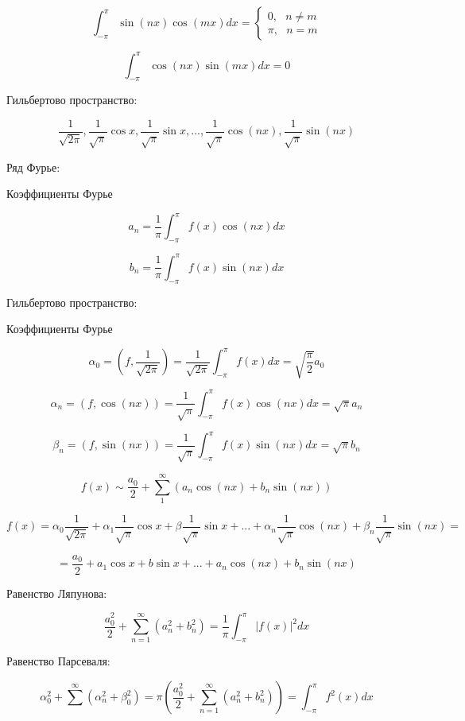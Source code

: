 \documentclass[12pt, a4paper]{report}
\begin{document}
\[ \int_{- \pi }^{\pi } \sin (nx )\cos (mx )dx = \begin{cases}
0 , \text{ } n \neq m \\ 
\pi , \text{ } n = m 
\end{cases}  \] 

\[ \int_{- \pi }^{\pi } \cos (nx ) \sin (mx ) dx = 0  \] 

Гильбертово пространство: 

\[ \frac{1}{\sqrt{2 \pi }} , \frac{1}{\sqrt{\pi } } \cos x , \frac{1}{\sqrt{\pi } } \sin x ,..., \frac{1}{\sqrt{\pi } } \cos(nx) , \frac{1}{\sqrt{\pi } } \sin (nx)      \] 

Ряд Фурье: 

Коэффициенты Фурье

\[ a_n = \frac{1}{\pi} \int_{- \pi }^{\pi}  f(x ) \cos (nx )dx \] 

\[ b_n = \frac{1}{\pi }\int_{- \pi }^{\pi } f(x ) \sin (nx ) dx    \] 

Гильбертово пространство: 

Коэффициенты Фурье

\[ \alpha_0 = \left(  f , \frac{1}{\sqrt{2 \pi } }  \right) = \frac{1}{\sqrt{2 \pi } } \int_{ - \pi }^{\pi } f (x ) dx = \sqrt{\frac{ \pi }{2 } } a_0    \] 

\[ \alpha_n = \left( f ,\cos (nx ) \right) = \frac{1}{\sqrt{\pi } } \int_{- \pi }^{\pi } f(x ) \cos (nx ) dx = \sqrt{\pi } a_n   \] 

\[ \beta_n = (f, \sin (nx )) =  \frac{1}{\sqrt{\pi } } \int_{- \pi }^{\pi } f(x ) \sin (nx ) dx = \sqrt{\pi } b_n   \] 

\[ f(x ) \sim \frac{a_0}{2 }  + \sum_{ 1 } ^{\infty  } ( a_n \cos (nx )+ b_n \sin (nx))  \]  

\[ f(x ) = \alpha_0 \frac{1}{\sqrt{2\pi } } + \alpha_1 \frac{1}{\sqrt{\pi } }\cos x + \beta \frac{1}{\sqrt{\pi } }\sin x + ... + \alpha_n \frac{1}{\sqrt{\pi } } \cos (nx ) + \beta_n \frac{1}{\sqrt{\pi } }\sin (nx ) =      \]  

\[ = \frac{a_0}{2 } + a_1 \cos x + b \sin x + ...+ a_n \cos (nx )+ b_n \sin (nx)  \] 

Равенство Ляпунова: 

\[ \frac{a_0 ^2 }{2} + \sum_{n =1}^{\infty  } (a_n ^2 + b_n ^2 )   = \frac{1}{\pi } \int_{- \pi }^{\pi } |f(x)| ^2 dx  \] 

Равенство Парсеваля: 

\[ \alpha_0 ^2 + \sum ^{\infty  } (\alpha_n ^2 + \beta_0 ^2 ) = \pi \left( \frac{a_0 ^2 }{2 } + \sum_{n =1}^{\infty  }  (a_n ^2 + b_n ^2 ) \right)  = \int_{- \pi }^{\pi } f ^2 ( x ) dx  \] 
\end{document}
